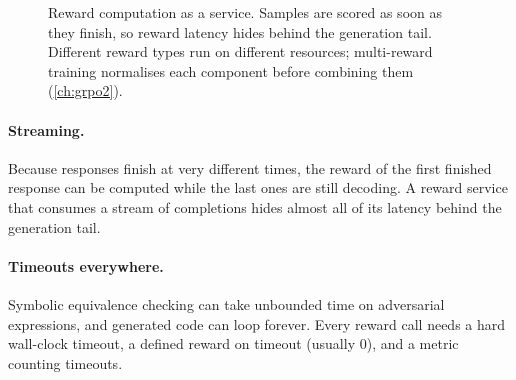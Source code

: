 \begin{figure}[t]
\centering
{}
\caption{Reward computation as a service. Samples are scored as soon as they finish, so
reward latency hides behind the generation tail. Different reward types run on different
resources; multi-reward training normalises each component before combining them
(\cref{ch:grpo2}).}
\label{fig:rlsys:reward}
\end{figure}

\paragraph{Streaming.} Because responses finish at very different times, the reward of the
first finished response can be computed while the last ones are still decoding. A reward
service that consumes a stream of completions hides almost all of its latency behind the
generation tail.

\paragraph{Timeouts everywhere.} Symbolic equivalence checking can take unbounded time on
adversarial expressions, and generated code can loop forever. Every reward call needs a hard
wall-clock timeout, a defined reward on timeout (usually 0), and a metric counting timeouts.

